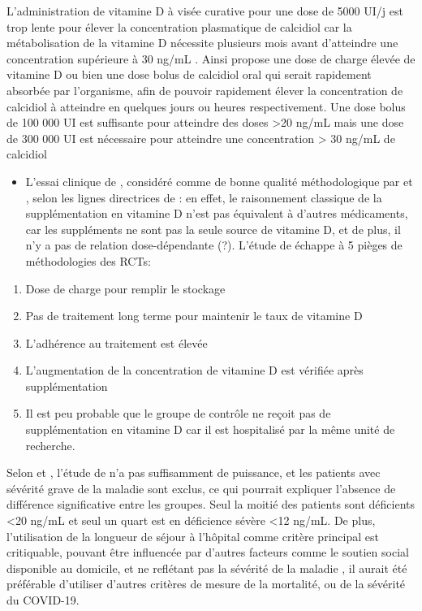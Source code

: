 \documentclass[
  a4paper,
  DIV=11,
  numbers=noendperiod,
  listof=totoc]{scrreprt}
\providecommand{\tightlist}{%
  \setlength{\itemsep}{0pt}\setlength{\parskip}{0pt}}\usepackage{longtable,booktabs,array}
\begin{document}
L'administration de vitamine D à visée curative pour une dose de 5000
UI/j est trop lente pour élever la concentration plasmatique de
calcidiol car la métabolisation de la vitamine D nécessite plusieurs
mois avant d'atteindre une concentration supérieure à 30 ng/mL
\autocite{Mocanu.2009}. Ainsi \textcite{Wimalawansa.2022} propose une
dose de charge élevée de vitamine D ou bien une dose bolus de calcidiol
oral qui serait rapidement absorbée par l'organisme, afin de pouvoir
rapidement élever la concentration de calcidiol à atteindre en quelques
jours ou heures respectivement. Une dose bolus de 100 000 UI est
suffisante pour atteindre des doses \textgreater20 ng/mL mais une dose
de 300 000 UI est nécessaire pour atteindre une concentration
\textgreater{} 30 ng/mL de calcidiol \autocite{Kearns.2014}

\begin{itemize}
\tightlist
\item
  L'essai clinique de \textcite{Murai.2021}, considéré comme de bonne
  qualité méthodologique par \textcite{Annweiler.2021} et
  \textcite{Argano.2023}, selon les lignes directrices de
  \textcite{Heaney.2014} : en effet, le raisonnement classique de la
  supplémentation en vitamine D n'est pas équivalent à d'autres
  médicaments, car les suppléments ne sont pas la seule source de
  vitamine D, et de plus, il n'y a pas de relation dose-dépendante (?).
  L'étude de \textcite{Murai.2021} échappe à 5 pièges de méthodologies
  des \acp{RCT}:
\end{itemize}

\begin{enumerate}
\def\labelenumi{\arabic{enumi})}
\tightlist
\item
  Dose de charge pour remplir le stockage
\item
  Pas de traitement long terme pour maintenir le taux de vitamine D
\item
  L'adhérence au traitement est élevée
\item
  L'augmentation de la concentration de vitamine D est vérifiée après
  supplémentation
\item
  Il est peu probable que le groupe de contrôle ne reçoit pas de
  supplémentation en vitamine D car il est hospitalisé par la même unité
  de recherche.
\end{enumerate}

Selon \textcite{Leaf.2021} et \textcite{Annweiler.2021}, l'étude de
\textcite{Murai.2021} n'a pas suffisamment de puissance, et les patients
avec sévérité grave de la maladie sont exclus, ce qui pourrait expliquer
l'absence de différence significative entre les groupes. Seul la moitié
des patients sont déficients \textless20 ng/mL et seul un quart est en
déficience sévère \textless12 ng/mL. De plus, l'utilisation de la
longueur de séjour à l'hôpital comme critère principal est critiquable,
pouvant être influencée par d'autres facteurs comme le soutien social
disponible au domicile, et ne reflétant pas la sévérité de la maladie
\autocite{Annweiler.2021}, il aurait été préférable d'utiliser d'autres
critères de mesure de la mortalité, ou de la sévérité du COVID-19.
\end{document}
